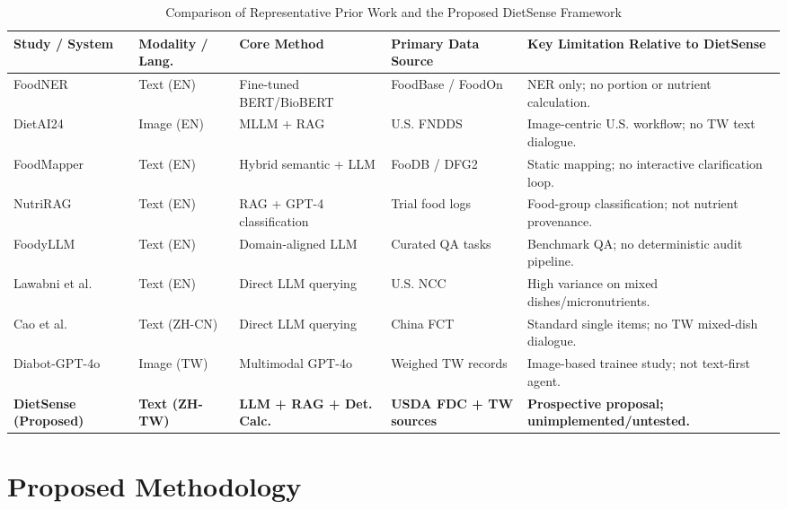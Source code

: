 \documentclass[conference]{IEEEtran}
\begin{document}
\begin{table}[t]
\centering
\caption{Comparison of Representative Prior Work and the Proposed DietSense Framework}
\label{tab:related_work}
\renewcommand{\arraystretch}{1.15}
\begin{tabularx}{\textwidth}{@{}l l l l X@{}}
\toprule
\textbf{Study / System} & \textbf{Modality / Lang.} & \textbf{Core Method} & \textbf{Primary Data Source} & \textbf{Key Limitation Relative to DietSense} \\
\midrule
FoodNER~\cite{stojanov2021foodner} & Text (EN) & Fine-tuned BERT/BioBERT & FoodBase / FoodOn & NER only; no portion or nutrient calculation. \\
DietAI24~\cite{yan2025dietai24} & Image (EN) & MLLM + RAG & U.S. FNDDS & Image-centric U.S. workflow; no TW text dialogue. \\
FoodMapper~\cite{lemay2026foodmapper} & Text (EN) & Hybrid semantic + LLM & FooDB / DFG2 & Static mapping; no interactive clarification loop. \\
NutriRAG~\cite{zhou2026nutrirag} & Text (EN) & RAG + GPT-4 classification & Trial food logs & Food-group classification; not nutrient provenance. \\
FoodyLLM~\cite{gjorgjevikj2026foodyllm} & Text (EN) & Domain-aligned LLM & Curated QA tasks & Benchmark QA; no deterministic audit pipeline. \\
Lawabni et al.~\cite{lawabni2026text} & Text (EN) & Direct LLM querying & U.S. NCC & High variance on mixed dishes/micronutrients. \\
Cao et al.~\cite{cao2026chinese} & Text (ZH-CN) & Direct LLM querying & China FCT & Standard single items; no TW mixed-dish dialogue. \\
Diabot-GPT-4o~\cite{chen2025diabot} & Image (TW) & Multimodal GPT-4o & Weighed TW records & Image-based trainee study; not text-first agent. \\
\textbf{DietSense (Proposed)} & \textbf{Text (ZH-TW)} & \textbf{LLM + RAG + Det. Calc.} & \textbf{USDA FDC + TW sources} & \textbf{Prospective proposal; unimplemented/untested.} \\
\bottomrule
\end{tabularx}
\end{table}

\section{Proposed Methodology}
\end{document}
